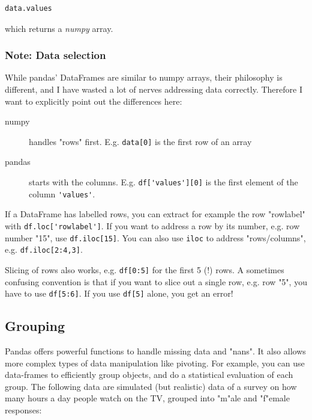 \begin{lstlisting}[language=Python]
    data.values
\end{lstlisting}

which returns a \emph{numpy} array.

\subsubsection{Note: Data selection}

While pandas' DataFrames are similar to numpy arrays, their philosophy is different, and I have wasted a lot of nerves addressing data correctly. Therefore I want to explicitly point out the differences here:

\begin{description}
  \item[numpy] handles "rows" first. E.g. \lstinline{data[0]} is the first row of an array
  \item[pandas] starts with the columns. E.g. \lstinline{df['values'][0]} is the first element of the column \lstinline{'values'}.
\end{description}

If a DataFrame has labelled rows, you can extract for example the row "rowlabel" with \lstinline{df.loc['rowlabel']}. If you want to address a row by its number, e.g. row number "15", use \lstinline{df.iloc[15]}. You can also use \lstinline{iloc} to address "rows/columns", e.g. \lstinline{df.iloc[2:4,3]}.

Slicing of rows also works, e.g. \lstinline{df[0:5]} for the first 5 (!) rows. A sometimes confusing convention is that if you want to slice out a single row, e.g. row "5", you have to use \lstinline{df[5:6]}. If you use \lstinline{df[5]} alone, you get an error!

\subsection{Grouping}

Pandas offers powerful functions to handle missing data and "nans". It also allows more complex types of data manipulation like pivoting.
For example, you can use data-frames to efficiently group objects, and do a statistical evaluation of each group. The following data are simulated (but realistic) data of a survey on how many hours a day people watch on the TV, grouped into "m"ale and "f"emale responses:

